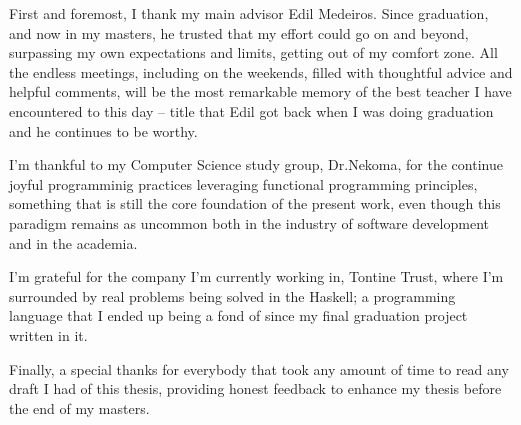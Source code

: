 First and foremost, I thank my main advisor Edil Medeiros.
Since graduation, and now in my masters, he trusted that my effort could go on and beyond, surpassing my own expectations
and limits, getting out of my comfort zone. All the endless meetings, including on the weekends, filled with thoughtful advice and helpful comments,
will be the most remarkable memory of the best teacher I have encountered to this day -- title that Edil got back when I was doing graduation and he
continues to be worthy.

I'm thankful to my Computer Science study group, Dr.Nekoma, for the continue joyful programminig practices leveraging functional programming principles, something that is
still the core foundation of the present work, even though this paradigm remains as uncommon both in the industry of software development and in the academia.

I'm grateful for the company I'm currently working in, Tontine Trust, where I'm surrounded by real problems being solved in the Haskell; a programming language
that I ended up being a fond of since my final graduation project written in it.

Finally, a special thanks for everybody that took any amount of time to read any draft I had of this thesis, providing honest feedback to enhance my thesis
before the end of my masters. 
